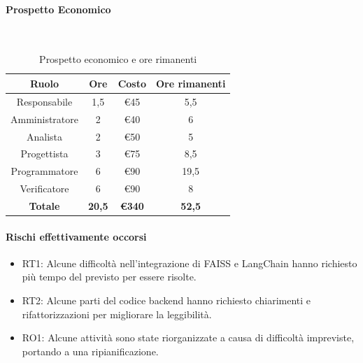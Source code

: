 \documentclass{article}
\begin{document}
            \paragraph{Prospetto Economico}\mbox{}\\
            \begin{table}[H]
                \centering
                \begin{tabular}{|c|c|c|c|}
                \hline
                \textbf{Ruolo}  & \textbf{Ore}  & \textbf{Costo}      & \textbf{Ore rimanenti}   \\ \hline
                Responsabile    & 1,5           & €45                 & 5,5                      \\ \hline
                Amministratore  & 2             & €40                 & 6                        \\ \hline
                Analista        & 2             & €50                 & 5                        \\ \hline
                Progettista     & 3             & €75                 & 8,5                      \\ \hline
                Programmatore   & 6             & €90                 & 19,5                     \\ \hline
                Verificatore    & 6             & €90                 & 8                        \\ \hline
                \textbf{Totale} & \textbf{20,5} & \textbf{\euro340}   & \textbf{52,5}            \\ \hline
                \end{tabular}
                \caption{Prospetto economico e ore rimanenti}
            \end{table}
            
            \paragraph{Rischi effettivamente occorsi}
            \begin{itemize}
                \item RT1: Alcune difficoltà nell’integrazione di FAISS e LangChain hanno richiesto più tempo del previsto per essere risolte.
                \item RT2: Alcune parti del codice backend hanno richiesto chiarimenti e rifattorizzazioni per migliorare la leggibilità.
                \item RO1: Alcune attività sono state riorganizzate a causa di difficoltà impreviste, portando a una ripianificazione.
            \end{itemize}
            
\end{document}
